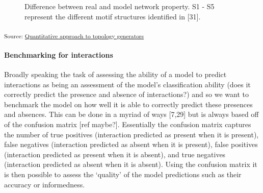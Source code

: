 \documentclass[
]{article}
\let\oldparagraph\paragraph
\renewcommand{\paragraph}[1]{\oldparagraph{#1}\mbox{}}
\begin{document}
\begin{figure}[H]


\caption{\label{fig-topology}Difference between real and model network
property. S1 - S5 represent the different motif structures identified in
{[}31{]}.}

\end{figure}%

\textsubscript{Source:
\href{https://BecksLab.github.io/ms_t_is_for_topology/notebooks/model_quantitative-preview.html\#cell-fig-topology}{Quantitative
approach to topology generators}}

\paragraph{Benchmarking for
interactions}\label{benchmarking-for-interactions}

Broadly speaking the task of assessing the ability of a model to predict
interactions as being an assessment of the model's classification
ability (does it correctly predict the presence and absence of
interactions?) and so we want to benchmark the model on how well it is
able to correctly predict these presences and absences. This can be done
in a myriad of ways {[}7,29{]} but is always based off of the confusion
matrix {[}ref maybe?{]}. Essentially the confusion matrix captures the
number of true positives (interaction predicted as present when it is
present), false negatives (interaction predicted as absent when it is
present), false positives (interaction predicted as present when it is
absent), and true negatives (interaction predicted as absent when it is
absent). Using the confusion matrix it is then possible to assess the
`quality' of the model predictions such as their accuracy or
informedness.
\end{document}
